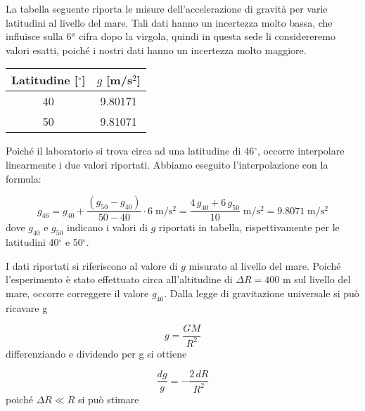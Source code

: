 
\label{g_confronto}

La tabella seguente riporta le misure dell'accelerazione di gravità
per varie latitudini al livello del mare. Tali dati hanno un incertezza molto bassa,
che influisce sulla 6$^a$ cifra dopo la virgola, quindi in questa sede li considereremo valori esatti,
poiché i nostri dati hanno un incertezza molto maggiore.

\begin{center}
    \begin{tabular}{c c}
        \toprule
        Latitudine [$^\circ$] & $g$ [m/s$^2$] \\
        \midrule
        40 & 9.80171 \\
        50 & 9.81071 \\
        \bottomrule
    \end{tabular}
\end{center}

Poiché il laboratorio si trova circa ad una latitudine di 46$^\circ$, occorre interpolare linearmente i due valori
riportati. Abbiamo eseguito l'interpolazione con la formula:

\begin{equation}
    g_{46} = g_{40} + \frac{(g_{50} - g_{40})}{50 - 40} \cdot 6 \; \si{\meter\per\square\second} =
    \frac{4\, g_{40} + 6\, g_{50}}{10} \; \si{\meter\per\square\second} =
    9.8071 \; \si{\meter\per\square\second}
    \label{eq:g46}
\end{equation}
%
dove $g_{40}$ e $g_{50}$ indicano i valori di $g$ riportati in tabella, rispettivamente per le latitudini 40$^\circ$ e 50$^\circ$.

I dati riportati si riferiscono al valore di $g$ misurato al livello del mare. Poiché l'esperimento è stato effettuato circa all'altitudine di
$\Delta R = 400$ m sul livello del mare, occorre correggere il valore $g_{46}$. Dalla legge di gravitazione universale si può ricavare g

\begin{equation}
    g = \frac{GM}{R^2}
\end{equation}
%
differenziando e dividendo per g si ottiene

\begin{equation}
    \frac{dg}{g} = - \frac{2\,dR}{R^2}
\end{equation}
%
poiché $\Delta R \ll R$ si può stimare

